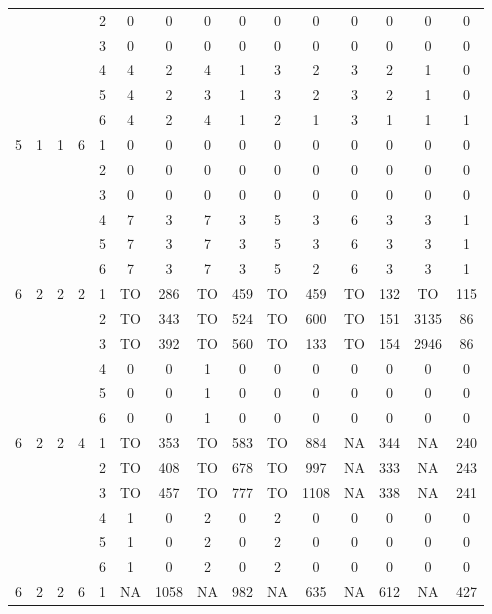 \begin{longtable}{|c|c|c|c|c|c c|c c|c c|c c|c c|}
 & & & & 2 & 0 & 0 & 0 & 0 & 0 & 0 & 0 & 0 & 0 & 0 \\
 & & & & 3 & 0 & 0 & 0 & 0 & 0 & 0 & 0 & 0 & 0 & 0 \\
 & & & & 4 & 4 & 2 & 4 & 1 & 3 & 2 & 3 & 2 & 1 & 0 \\
 & & & & 5 & 4 & 2 & 3 & 1 & 3 & 2 & 3 & 2 & 1 & 0 \\
 & & & & 6 & 4 & 2 & 4 & 1 & 2 & 1 & 3 & 1 & 1 & 1 \\
\hline
\multirow{6}{*}{5} & \multirow{6}{*}{1} & \multirow{6}{*}{1} & \multirow{6}{*}{6} & 1 & 0 & 0 & 0 & 0 & 0 & 0 & 0 & 0 & 0 & 0 \\
 & & & & 2 & 0 & 0 & 0 & 0 & 0 & 0 & 0 & 0 & 0 & 0 \\
 & & & & 3 & 0 & 0 & 0 & 0 & 0 & 0 & 0 & 0 & 0 & 0 \\
 & & & & 4 & 7 & 3 & 7 & 3 & 5 & 3 & 6 & 3 & 3 & 1 \\
 & & & & 5 & 7 & 3 & 7 & 3 & 5 & 3 & 6 & 3 & 3 & 1 \\
 & & & & 6 & 7 & 3 & 7 & 3 & 5 & 2 & 6 & 3 & 3 & 1 \\
\hline
\multirow{6}{*}{6} & \multirow{6}{*}{2} & \multirow{6}{*}{2} & \multirow{6}{*}{2} & 1 & TO & 286 & TO & 459 & TO & 459 & TO & 132 & TO & 115 \\
 & & & & 2 & TO & 343 & TO & 524 & TO & 600 & TO & 151 & 3135 & 86 \\
 & & & & 3 & TO & 392 & TO & 560 & TO & 133 & TO & 154 & 2946 & 86 \\
 & & & & 4 & 0 & 0 & 1 & 0 & 0 & 0 & 0 & 0 & 0 & 0 \\
 & & & & 5 & 0 & 0 & 1 & 0 & 0 & 0 & 0 & 0 & 0 & 0 \\
 & & & & 6 & 0 & 0 & 1 & 0 & 0 & 0 & 0 & 0 & 0 & 0 \\
\hline
\multirow{6}{*}{6} & \multirow{6}{*}{2} & \multirow{6}{*}{2} & \multirow{6}{*}{4} & 1 & TO & 353 & TO & 583 & TO & 884 & NA & 344 & NA & 240 \\
 & & & & 2 & TO & 408 & TO & 678 & TO & 997 & NA & 333 & NA & 243 \\
 & & & & 3 & TO & 457 & TO & 777 & TO & 1108 & NA & 338 & NA & 241 \\
 & & & & 4 & 1 & 0 & 2 & 0 & 2 & 0 & 0 & 0 & 0 & 0 \\
 & & & & 5 & 1 & 0 & 2 & 0 & 2 & 0 & 0 & 0 & 0 & 0 \\
 & & & & 6 & 1 & 0 & 2 & 0 & 2 & 0 & 0 & 0 & 0 & 0 \\
\hline
\multirow{6}{*}{6} & \multirow{6}{*}{2} & \multirow{6}{*}{2} & \multirow{6}{*}{6} & 1 & NA & 1058 & NA & 982 & NA & 635 & NA & 612 & NA & 427 \\

\end{longtable}
